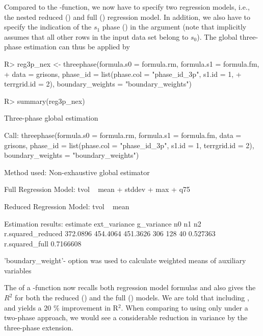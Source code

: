 \documentclass[article]{jss}
\begin{document}
Compared to the -function, we now have to specify two regression models, i.e., the nested reduced () and full () regression model. In addition, we also have to specify the indication of the $s_1$ phase () in the argument  (note that  implicitly assumes that all other rows in the input data set belong to $s_0$). The global three-phase estimation can thus be applied by


\begin{Schunk}
\begin{Sinput}
R> reg3p_nex <- threephase(formula.s0 = formula.rm, formula.s1 = formula.fm, 
+    data = grisons, phase_id = list(phase.col = "phase_id_3p", s1.id = 1,  
+    terrgrid.id = 2), boundary_weights = "boundary_weights")
\end{Sinput}
\end{Schunk}



\begin{Schunk}
\begin{Sinput}
R> summary(reg3p_nex)
\end{Sinput}
\begin{Soutput}
Three-phase global estimation
 
Call: 
threephase(formula.s0 = formula.rm, formula.s1 = formula.fm, 
    data = grisons, phase_id = list(phase.col = "phase_id_3p", 
        s1.id = 1, terrgrid.id = 2), boundary_weights = "boundary_weights")

Method used:
Non-exhaustive global estimator
 
Full Regression Model:
tvol ~ mean + stddev + max + q75

Reduced Regression Model:
tvol ~ mean

Estimation results:
 estimate ext_variance g_variance  n0  n1 n2 r.squared_reduced
 372.0896     454.4064   451.3626 306 128 40          0.527363
 r.squared_full
      0.7166608

'boundary_weight'- option was used to calculate weighted means of auxiliary variables
\end{Soutput}
\end{Schunk}


The  of a -function now recalls both regression model formulas and also gives the $R^2$ for both the reduced () and the full () models. We are told that including ,  and  yields a 20 \% improvement in R$^2$. When comparing to using only  under a two-phase approach, we would see a considerable reduction in variance by the three-phase extension.
\end{document}
